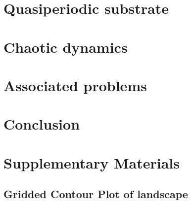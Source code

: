 \documentclass[twocolumn,preprintnumbers,amsmath,amssymb,aps,prx]{revtex4}
\begin{document}
\section{Quasiperiodic substrate}
\label{sec:quasiperiod}	%

\section{Chaotic dynamics}
\label{sec:chaos}	%

\section{Associated problems}
\label{sec:problems}	%


\section{Conclusion}
\label{sec:conclusion}	%

\section{Supplementary Materials}

\subsection{Gridded Contour Plot of landscape}
\end{document}
